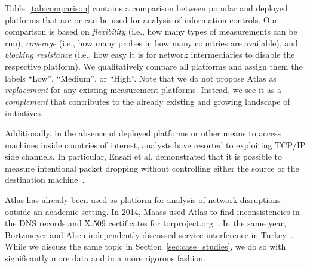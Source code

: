 Table~\ref{tab:comparison} contains a comparison between popular and deployed
platforms that are or can be used for analysis of information controls.  Our comparison is
based on \emph{flexibility} (i.e., how many types of measurements can be run),
\emph{coverage} (i.e., how many probes in how many countries are available),
and \emph{blocking resistance} (i.e., how easy it is for network intermediaries to disable the
respective platform).  We qualitatively compare all platforms and assign them
the labels ``Low'', ``Medium'', or ``High''.  Note that we do not propose
Atlas as \emph{replacement} for any existing measurement platforms.
Instead, we see it as a \emph{complement} that contributes to the already
existing and growing landscape of initiatives.

Additionally, in the absence of deployed platforms or other means to access
machines inside countries of interest, analysts have resorted to
exploiting TCP/IP side channels.  In particular, Ensafi et al. demonstrated
that it is possible to measure intentional packet dropping without controlling
either the source or the destination machine~\cite{Ensafi2014}.

Atlas has already been used as platform for analysis of network
disruptions outside an academic setting.  In 2014, Maass used Atlas to
find inconsistencies in the DNS records and X.509 certificates for
torproject.org~\cite{Maass2014}.  In the same year, Bortzmeyer and Aben
independently discussed service interference in
Turkey~\cite{Bortzmeyer14,Aben14}.  While we discuss the same topic in
Section~\ref{sec:case_studies}, we do so with significantly more data
and in a more rigorous fashion.
